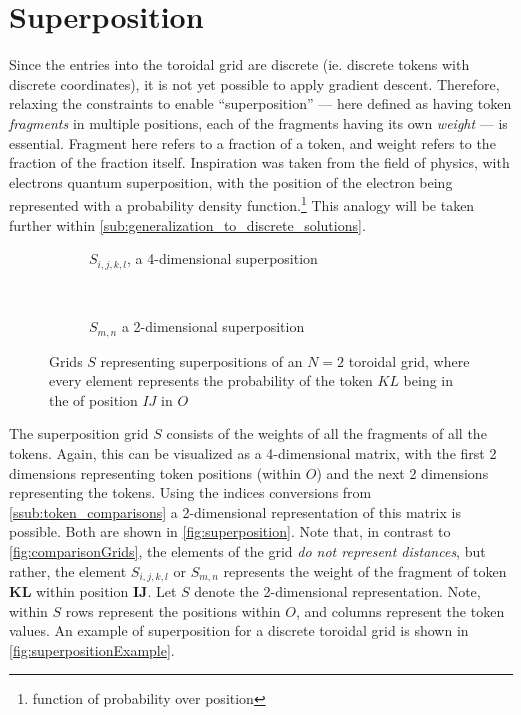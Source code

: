 
\section{Superposition}%
\label{sec:superposition}
Since the entries into the toroidal grid are discrete (ie. discrete tokens with discrete coordinates), it is not yet possible to apply gradient descent. Therefore, relaxing the constraints to enable ``superposition'' --- here defined as having token \emph{fragments} in multiple positions, each of the fragments having its own \emph{weight} --- is essential. Fragment here refers to a fraction of a token, and weight refers to the fraction of the fraction itself. Inspiration was taken from the field of physics, with electrons quantum superposition, with the position of the electron being represented with a probability density function.\footnote{function of probability over position} This analogy will be taken further within \ref{sub:generalization_to_discrete_solutions}.

\begin{figure}[htpb]
    \centering
    \begin{subfigure}[t]{0.5\textwidth}
    \begin{center}
    \end{center}
    \caption{$S_{i,j,k,l}$, a 4-dimensional superposition}
    \end{subfigure}%
    ~
    \begin{subfigure}[t]{0.5\textwidth}
    \begin{center}
    \end{center}
    \caption{$S_{m,n}$ a 2-dimensional superposition}
    \end{subfigure}

    \caption{Grids $S$ representing superpositions of an $N=2$ toroidal grid, where every element represents the probability of the token $KL$ being in the of position $IJ$ in $O$}%
    \label{fig:superposition}
\end{figure}

The superposition grid $S$ consists of the weights of all the fragments of all the tokens. Again, this can be visualized as a 4-dimensional matrix, with the first 2 dimensions representing token positions (within $O$) and the next 2 dimensions representing the tokens. Using the indices conversions from \ref{ssub:token_comparisons} a 2-dimensional representation of this matrix is possible. Both are shown in \autoref{fig:superposition}. Note that, in contrast to \autoref{fig:comparisonGrids}, the elements of the grid \emph{do not represent distances}, but rather, the element $S_{i,j,k,l}$ or $S_{m,n}$ represents the weight of the fragment of token $\bm{KL}$ within position $\bm{IJ}$. Let $S$ denote the 2-dimensional representation. Note, within $S$ rows represent the positions within $O$, and columns represent the token values. An example of superposition for a discrete toroidal grid is shown in \autoref{fig:superpositionExample}.

